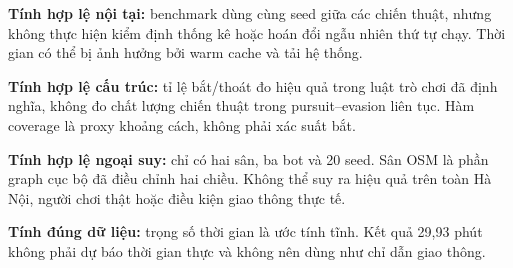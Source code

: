 \textbf{Tính hợp lệ nội tại:} benchmark dùng cùng seed giữa các chiến thuật, nhưng
không thực hiện kiểm định thống kê hoặc hoán đổi ngẫu nhiên thứ tự chạy. Thời gian
có thể bị ảnh hưởng bởi warm cache và tải hệ thống.

\textbf{Tính hợp lệ cấu trúc:} tỉ lệ bắt/thoát đo hiệu quả trong luật trò chơi đã
định nghĩa, không đo chất lượng chiến thuật trong pursuit--evasion liên tục. Hàm
coverage là proxy khoảng cách, không phải xác suất bắt.

\textbf{Tính hợp lệ ngoại suy:} chỉ có hai sân, ba bot và 20 seed. Sân OSM là
phần graph cục bộ đã điều chỉnh hai chiều. Không thể suy ra hiệu quả trên toàn Hà
Nội, người chơi thật hoặc điều kiện giao thông thực tế.

\textbf{Tính đúng dữ liệu:} trọng số thời gian là ước tính tĩnh. Kết quả 29,93
phút không phải dự báo thời gian thực và không nên dùng như chỉ dẫn giao thông.
